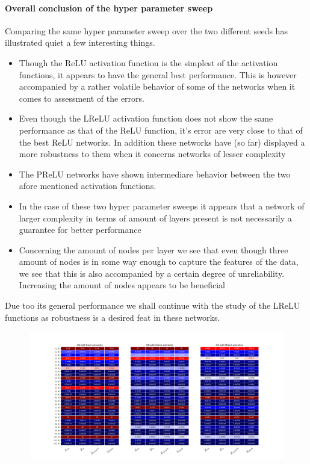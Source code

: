 \documentclass[]{article}
\begin{document}
\paragraph{Overall conclusion of the hyper parameter sweep}

Comparing the same hyper parameter sweep over the two different seeds has illustrated quiet a few interesting things.
\begin{itemize}
	\item Though the ReLU activation function is the simplest of the activation functions, it appears to have the general best performance. This is however accompanied by a rather volatile behavior of some of the networks when it comes to assessment of the errors. 
	\item Even though the LReLU activation function does not show the same performance as that of the ReLU function, it's error are very close to that of the best ReLU networks. In addition these networks have (so far) displayed a more robustness to them when it concerns networks of lesser complexity
	\item The PReLU networks have shown intermediare behavior between the two afore mentioned activation functions.
	\item In the case of these two hyper parameter sweeps it appears that a network of larger complexity in terms of amount of layers present is not necessarily a guarantee for better performance
	\item Concerning the amount of nodes per layer we see that even though three amount of nodes is in some way enough to capture the features of the data, we see that this is also accompanied by a certain degree of unreliability. Increasing the amount of nodes appears to be beneficial  
\end{itemize} 
Due too its general performance we shall continue with the study of the LReLU functions as robustness is a desired feat in these networks.
\newpage
{}
\thispagestyle{empty}
\begin{figure}
	\centering
	\includegraphics[angle=90,height=\textheight]{"Seed 1"}
\end{figure}
\end{document}
